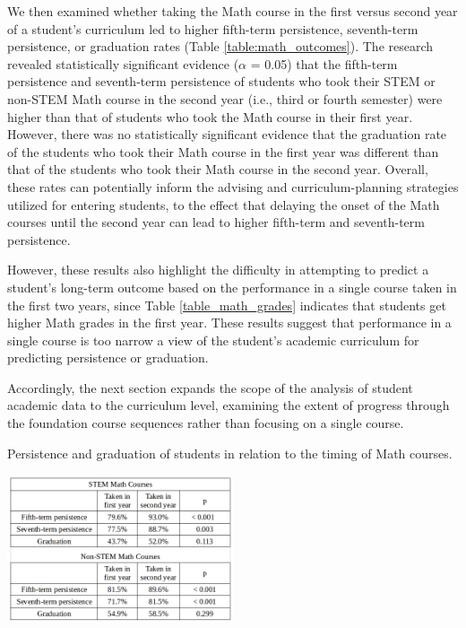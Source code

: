We then examined whether taking the Math course in the first versus second year of a student's curriculum led to higher fifth-term persistence, seventh-term persistence, or graduation rates (Table \ref{table:math_outcomes}).  The research revealed statistically significant evidence ($\alpha$ = 0.05) that the fifth-term persistence and seventh-term persistence of students who took their STEM or non-STEM Math course in the second year (i.e., third or fourth semester) were higher than that of students who took the Math course in their first year.  However, there was no statistically significant evidence that the graduation rate of the students who took their Math course in the first year was different than that of the students who took their Math course in the second year.  Overall, these rates can potentially inform the advising and curriculum-planning strategies utilized for entering students, to the effect that delaying the onset of the Math courses until the second year can lead to higher fifth-term and seventh-term persistence.  

However, these results also highlight the difficulty in attempting to predict a student's long-term outcome based on the performance in a single course taken in the first two years, since Table \ref{table_math_grades} indicates that students get higher Math grades in the first year.  These results suggest that performance in a single course is too narrow a view of the student's academic curriculum for predicting persistence or graduation.

Accordingly, the next section expands the scope of the analysis of student academic data to the curriculum level, examining the extent of progress through the foundation course sequences rather than focusing on a single course. 

\begin{table}[htbp]
\centering
\caption{Persistence and graduation of students in relation to the timing of Math courses.}
\includegraphics[width=0.5\textwidth]{tables/math_outcomes.png}
\label{table:math_outcomes}
\end{table}



